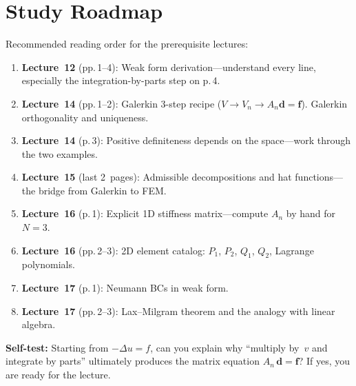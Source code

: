 \documentclass[11pt,a4paper]{article}
\theoremstyle{plain}
\theoremstyle{remark}
\begin{document}
\section{Study Roadmap}
\label{sec:roadmap}

Recommended reading order for the prerequisite lectures:

\begin{enumerate}
  \item \textbf{Lecture~12} (pp.\,1--4):
        Weak form derivation---understand every line, especially the
        integration-by-parts step on p.\,4.
  \item \textbf{Lecture~14} (pp.\,1--2):
        Galerkin 3-step recipe ($V \to V_n \to A_n\mathbf{d}=\mathbf{f}$).
        Galerkin orthogonality and uniqueness.
  \item \textbf{Lecture~14} (p.\,3):
        Positive definiteness depends on the space---work through the
        two examples.
  \item \textbf{Lecture~15} (last 2~pages):
        Admissible decompositions and hat functions---the bridge from
        Galerkin to FEM.
  \item \textbf{Lecture~16} (p.\,1):
        Explicit 1D stiffness matrix---compute $A_n$ by hand for $N=3$.
  \item \textbf{Lecture~16} (pp.\,2--3):
        2D element catalog: $P_1$, $P_2$, $Q_1$, $Q_2$, Lagrange
        polynomials.
  \item \textbf{Lecture~17} (p.\,1):
        Neumann BCs in weak form.
  \item \textbf{Lecture~17} (pp.\,2--3):
        Lax--Milgram theorem and the analogy with linear algebra.
\end{enumerate}

\medskip
\textbf{Self-test:} Starting from $-\Delta u = f$, can you explain why
``multiply by~$v$ and integrate by parts'' ultimately produces the
matrix equation $A_n\,\mathbf{d} = \mathbf{f}$?  If yes, you are ready
for the lecture.
\end{document}
